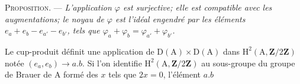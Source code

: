 \textsc{Proposition.} --- \textit{L'application $\varphi$ est surjective; elle est
compatible avec les augmentations; le noyau de $\varphi$ est l'idéal engendré
par les éléments $e_a+e_b-e_{a'}-e_{b'}$, tels que
$\varphi_a+\varphi_b=\varphi_{a'}+\varphi_{b'}$.}

Le cup-produit définit une application de $\mathrm D(\mathrm A)\times\mathrm D(\mathrm A)$
dans $\mathrm H^2(\mathrm A,\mathbf Z/2\mathbf Z)$ notée $(e_a,e_b)\to a.b$.
Si l'on identifie $\mathrm H^2(\mathrm A,\mathbf Z/2\mathbf Z)$ au sous-groupe
du groupe de Brauer de $\mathrm A$ formé des $x$ tels que $2x=0$, l'élément $a.b$
